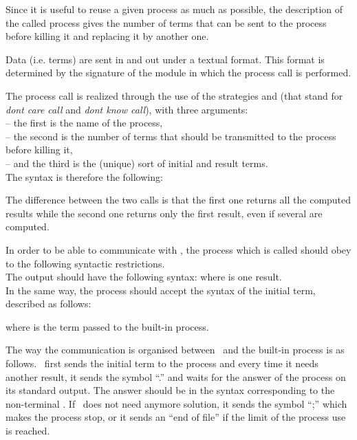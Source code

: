 Since it is useful to reuse a given process as much as possible,
the description of the called process gives the number of
terms that can be sent to the process before killing it and replacing
it by another one.

Data (i.e. terms) are sent in and out under a textual format. This
format is determined by the signature of the module in which the
process call is performed.

The process call is realized through the use of the strategies
 and  (that stand for {\em dont care
call} and {\em dont know call}), with three arguments:\\
-- the first is the name of the process,\\
-- the second is the number of terms that should be transmitted to the
process before killing it,\\
-- and the third is the (unique) sort of initial and result terms.\\
The syntax is therefore the following:


The difference between the two calls is that the first one returns all
the computed results while the second one returns only the first result,
even if several are computed.

In order to be able to communicate with \elan, the process which is called
should obey to the following syntactic restrictions.\\
The output should have the following syntax:
where  is one result.\\
In the same way, the process should accept the syntax of the initial
term, described as follows:


where  is the term passed to the built-in process.

The way the communication is organised between \elan\ and the built-in
process is as follows. \elan\ first sends the initial term to the
process and every time it needs another result, it sends the symbol
``\sym.'' and waits for the answer of the process on its standard
output. The answer should be in the syntax corresponding to the
non-terminal . If \elan\ does not need anymore
solution, it sends the symbol ``\sym;'' which makes the process stop,
or it sends an ``end of file'' if the limit of the process use is
reached.

